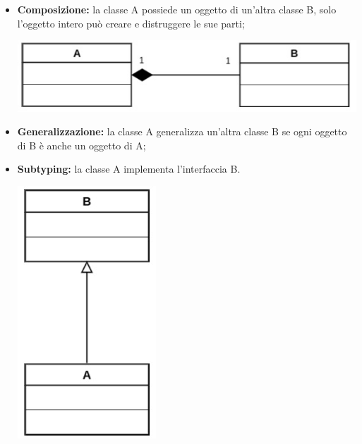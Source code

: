 \begin{itemize}
\begin{center}
		\end{center}
		\item \textbf{Composizione:} la classe A possiede un oggetto di un'altra classe B, solo l'oggetto intero può creare e distruggere le sue parti;
		\begin{center}
			\includegraphics[scale=0.4]{Immagini/UML/Composizione} \\
		\end{center}
		\item \textbf{Generalizzazione:} la classe A generalizza un'altra classe B se ogni oggetto di B è anche un oggetto di A;
		\item \textbf{Subtyping:}  la classe A implementa l'interfaccia B. 
		\begin{center}
				\begin{minipage}{0.4\textwidth}
					\begin{center}
						\includegraphics[scale=0.4]{Immagini/UML/Generalizzazione}\\
					\end{center}
			\end{minipage}
			\begin{minipage}{0.5\textwidth}
				\begin{center}

\end{center}
\end{minipage}
\end{center}
\end{itemize}
